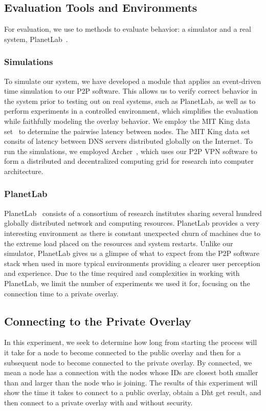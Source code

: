 \documentclass[conference]{IEEEtran}
\begin{document}
\subsection{Evaluation Tools and Environments}
For evaluation, we use to methods to evaluate behavior:  a simulator and a real
system, PlanetLab~\cite{planetlab}.

\subsubsection{Simulations}
To simulate our system, we have developed a module that applies an event-driven
time simulation to our P2P software.  This allows us to verify correct behavior
in the system prior to testing out on real systems, such as PlanetLab, as well
as to perform experiments in a controlled environment, which simplifies the
evaluation while faithfully modeling the overlay behavior.  We employ the MIT
King data set~\cite{king_data} to determine the pairwise latency between nodes.
The MIT King data set consits of latency between DNS servers distributed
globally on the Internet.  To run the simulations, we employed
Archer~\cite{archer}, which uses our P2P VPN software to form a distributed and
decentralized computing grid for research into computer architecture.

\subsubsection{PlanetLab}
PlanetLab~\cite{planetlab} consists of a consortium of research institutes sharing
several hundred globally distributed network and computing resources.  PlanetLab
provides a very interesting environment as there is constant unexpected churn
of machines due to the extreme load placed on the resources and system restarts.
Unlike our simulator, PlanetLab gives us a glimpse of what to expect from the
P2P software stack when used in more typical environments providing a clearer
user perception and experience.  Due to the time required and complexities in
working with PlanetLab, we limit the number of experiments we used it for,
focusing on the connection time to a private overlay.

\subsection{Connecting to the Private Overlay}
In this experiment, we seek to determine how long from starting the process will
it take for a node to become connected to the public overlay and then for a
subsequent node to become connected to the private overlay.  By connected, we
mean a node has a connection with the nodes whose IDs are closest both smaller
than and larger than the node who is joining.  The results of this experiment
will show the time it takes to connect to a public overlay, obtain a Dht get
result, and then connect to a private overlay with and without security.
\end{document}
